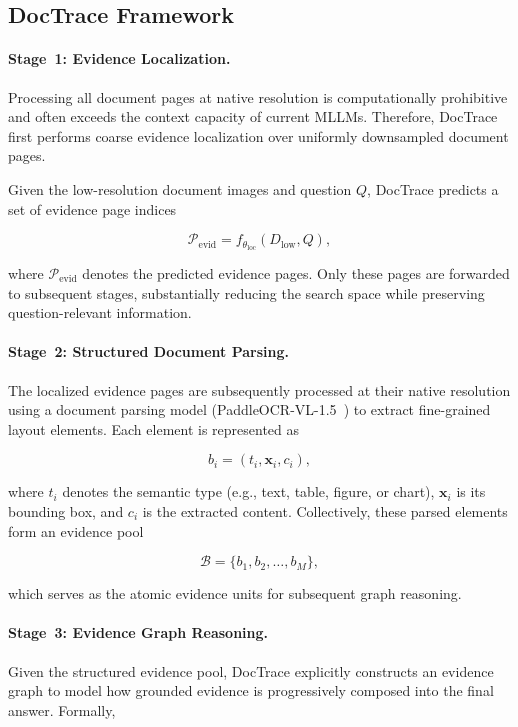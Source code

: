 \documentclass[letterpaper]{article} %
\begin{document}
\subsection{DocTrace Framework}

\paragraph{Stage~1: Evidence Localization.}

Processing all document pages at native resolution is computationally prohibitive and often exceeds the context capacity of current MLLMs. Therefore, DocTrace first performs coarse evidence localization over uniformly downsampled document pages.

Given the low-resolution document images and question $Q$, DocTrace predicts a set of evidence page indices

\[
\mathcal{P}_{\mathrm{evid}}
=
f_{\theta_{\mathrm{loc}}}
(D_{\mathrm{low}},Q),
\]

where $\mathcal{P}_{\mathrm{evid}}$ denotes the predicted evidence pages. Only these pages are forwarded to subsequent stages, substantially reducing the search space while preserving question-relevant information.


\paragraph{Stage~2: Structured Document Parsing.}

The localized evidence pages are subsequently processed at their native resolution using a document parsing model (PaddleOCR-VL-1.5~\cite{cui2026paddleocr}) to extract fine-grained layout elements. Each element is represented as

\[
b_i=(t_i,\mathbf{x}_i,c_i),
\]

where $t_i$ denotes the semantic type (e.g., text, table, figure, or chart), $\mathbf{x}_i$ is its bounding box, and $c_i$ is the extracted content. Collectively, these parsed elements form an evidence pool

\[
\mathcal{B}=\{b_1,b_2,\ldots,b_M\},
\]

which serves as the atomic evidence units for subsequent graph reasoning.


\paragraph{Stage~3: Evidence Graph Reasoning.}

Given the structured evidence pool, DocTrace explicitly constructs an evidence graph to model how grounded evidence is progressively composed into the final answer. Formally,
\end{document}
